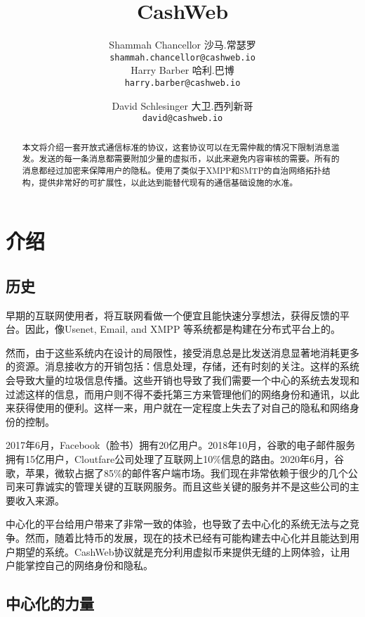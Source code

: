 \documentclass{article}
\title{CashWeb}
\author{
  Shammah Chancellor 沙马.常瑟罗\\
  \texttt{shammah.chancellor@cashweb.io} \\
  \AND
  Harry Barber 哈利.巴博\\
  \texttt{harry.barber@cashweb.io} \\
  \and
  David Schlesinger 大卫.西列新哥\\
  \texttt{david@cashweb.io} \\
}
\begin{document}
\maketitle

\begin{abstract}
本文将介绍一套开放式通信标准的协议，这套协议可以在无需仲裁的情况下限制消息滥发。发送的每一条消息都需要附加少量的虚拟币，以此来避免内容审核的需要。所有的消息都经过加密来保障用户的隐私。使用了类似于XMPP和SMTP的自治网络拓扑结构，提供非常好的可扩展性，以此达到能替代现有的通信基础设施的水准。
\end{abstract}

\section{介绍}

\subsection{历史}

早期的互联网使用者，将互联网看做一个便宜且能快速分享想法，获得反馈的平台。因此，像Usenet\supercite{rfc5536}\supercite{rfc5537}, Email\supercite{rfc5322}\supercite{rfc1939}\supercite{rfc5321}\supercite{rfc4551}, and XMPP\supercite{rfc3920}\supercite{rfc3921}\supercite{rfc3922}\supercite{rfc3923} 等系统都是构建在分布式平台上的。

然而，由于这些系统内在设计的局限性，接受消息总是比发送消息显著地消耗更多的资源。消息接收方的开销包括：信息处理，存储，还有时刻的关注。这样的系统会导致大量的垃圾信息传播。这些开销也导致了我们需要一个中心的系统去发现和过滤这样的信息，而用户则不得不委托第三方来管理他们的网络身份和通讯，以此来获得使用的便利。这样一来，用户就在一定程度上失去了对自己的隐私和网络身份的控制。

2017年6月，Facebook（脸书）拥有20亿用户。2018年10月，谷歌的电子邮件服务拥有15亿用户\supercite{gmail2018}，Cloutfare公司处理了互联网上10\%信息的路由\supercite{cloudflare2018}。2020年6月，谷歌，苹果，微软占据了85\%的邮件客户端市场\supercite{emailshare2020}。我们现在非常依赖于很少的几个公司来可靠诚实的管理关键的互联网服务。而且这些关键的服务并不是这些公司的主要收入来源。

中心化的平台给用户带来了非常一致的体验，也导致了去中心化的系统无法与之竞争。然而，随着比特币\supercite{nakamoto2008bpp}的发展，现在的技术已经有可能构建去中心化并且能达到用户期望的系统。CashWeb协议就是充分利用虚拟币来提供无缝的上网体验，让用户能掌控自己的网络身份和隐私。

\subsection{中心化的力量}
\end{document}
